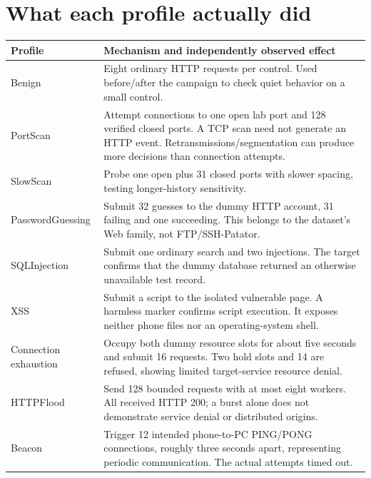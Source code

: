 \documentclass[11pt,a4paper,oneside]{report}
\begin{document}
\section{What each profile actually did}
\begin{longtable}{p{}p{}}
\toprule Profile & Mechanism and independently observed effect\\\midrule\endhead
Benign & Eight ordinary HTTP requests per control. Used before/after the campaign to check quiet behavior on a small control.\\
PortScan & Attempt connections to one open lab port and 128 verified closed ports. A TCP scan need not generate an HTTP event. Retransmissions/segmentation can produce more decisions than connection attempts.\\
SlowScan & Probe one open plus 31 closed ports with slower spacing, testing longer-history sensitivity.\\
PasswordGuessing & Submit 32 guesses to the dummy HTTP account, 31 failing and one succeeding. This belongs to the dataset's Web family, not FTP/SSH-Patator.\\
SQLInjection & Submit one ordinary search and two injections. The target confirms that the dummy database returned an otherwise unavailable test record.\\
XSS & Submit a script to the isolated vulnerable page. A harmless marker confirms script execution. It exposes neither phone files nor an operating-system shell.\\
Connection exhaustion & Occupy both dummy resource slots for about five seconds and submit 16 requests. Two hold slots and 14 are refused, showing limited target-service resource denial.\\
HTTPFlood & Send 128 bounded requests with at most eight workers. All received HTTP 200; a burst alone does not demonstrate service denial or distributed origins.\\
Beacon & Trigger 12 intended phone-to-PC PING/PONG connections, roughly three seconds apart, representing periodic communication. The actual attempts timed out.\\
\bottomrule
\end{longtable}
\end{document}
